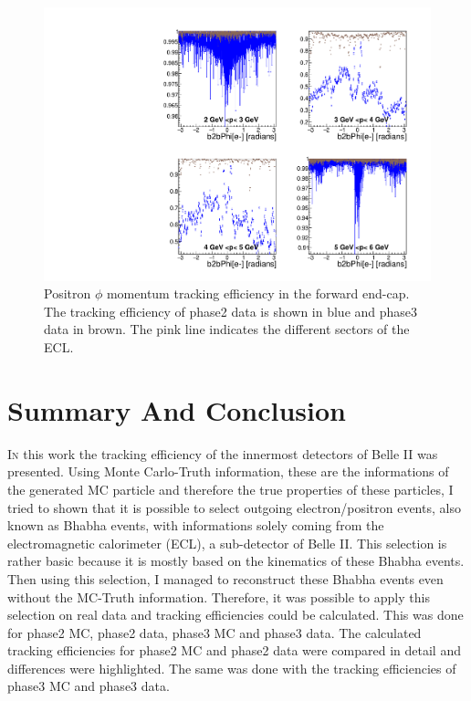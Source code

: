 \documentclass[a4paper,11pt,twosided,final,german,openbib,pdftex,listof=totoc,bibliography=totoc]{scrbook}
\begin{document}
\begin{figure}[!htbp]
	\centering
	\includegraphics[width=\textwidth]{Plots/comp/cMPhiepEC_Data.pdf}
	\caption[Momentum $\phi$ Positron Efficiency Backward End-Cap Phase2 And Phase3 Data]{Positron $\phi$ momentum tracking efficiency in the forward end-cap. The tracking efficiency of phase2 data is shown in blue and phase3 data in brown. The pink line indicates the different sectors of the ECL.}
	\label{plt:compPhiemEC}
\end{figure}


\chapter{Summary And Conclusion}
\label{cha:Conclusion}

\lettrine{I}{n} this work the tracking efficiency of the innermost detectors of Belle II was presented. 
Using Monte Carlo-Truth information, these are the informations of the generated MC particle and therefore the true properties of these particles, I tried to shown that it is possible to select outgoing electron/positron events, also known as Bhabha events, with informations solely coming from the electromagnetic calorimeter (ECL), a sub-detector of Belle II. 
This selection is rather basic because it is mostly based on the kinematics of these Bhabha events. Then using this selection, I managed to reconstruct these Bhabha events even without the MC-Truth information. Therefore, it was possible to apply this selection on real data and tracking efficiencies could be calculated. 
This was done for phase2 MC, phase2 data, phase3 MC and phase3 data.
The calculated tracking efficiencies for phase2 MC and phase2 data were compared in detail and differences were highlighted. The same was done with the tracking efficiencies of phase3 MC and phase3 data. 
\newline 
\end{document}
